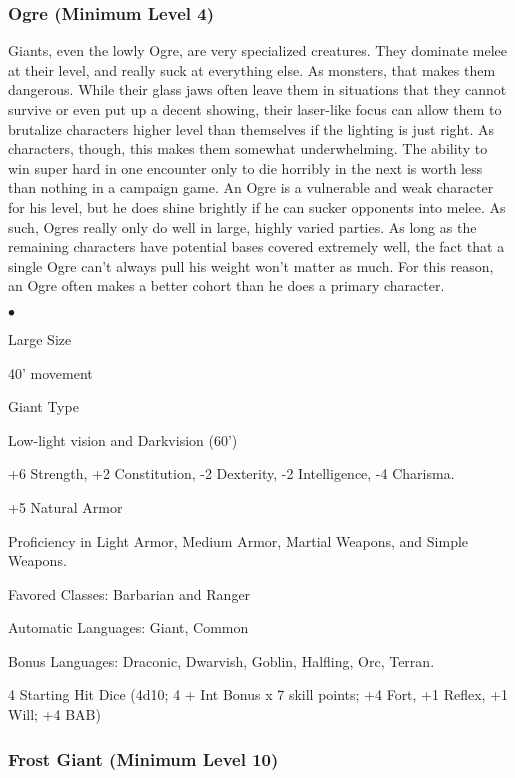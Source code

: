 \subsubsection{Ogre (Minimum Level 4)}

Giants, even the lowly Ogre, are very specialized creatures. They dominate melee at their level, and really suck at everything else. As monsters, that makes them dangerous. While their glass jaws often leave them in situations that they cannot survive or even put up a decent showing, their laser-like focus can allow them to brutalize characters higher level than themselves if the lighting is just right. As characters, though, this makes them somewhat underwhelming. The ability to win super hard in one encounter only to die horribly in the next is worth less than nothing in a campaign game. An Ogre is a vulnerable and weak character for his level, but he does shine brightly if he can sucker opponents into melee. As such, Ogres really only do well in large, highly varied parties. As long as the remaining characters have potential bases covered extremely well, the fact that a single Ogre can't always pull his weight won't matter as much. For this reason, an Ogre often makes a better cohort than he does a primary character.

\begin{list}{$\bullet$}{\itemspace}
    \item Large Size
    \item 40' movement
    \item Giant Type
    \item Low-light vision and Darkvision (60')
    \item +6 Strength, +2 Constitution, -2 Dexterity, -2 Intelligence, -4 Charisma.
    \item +5 Natural Armor
    \item Proficiency in Light Armor, Medium Armor, Martial Weapons, and Simple Weapons.
    \item Favored Classes: Barbarian and Ranger
    \item Automatic Languages: Giant, Common
    \item Bonus Languages: Draconic, Dwarvish, Goblin, Halfling, Orc, Terran.
    \item 4 Starting Hit Dice (4d10; 4 + Int Bonus x 7 skill points; +4 Fort, +1 Reflex, +1 Will; +4 BAB)
\end{list}

\subsubsection{Frost Giant (Minimum Level 10)}

